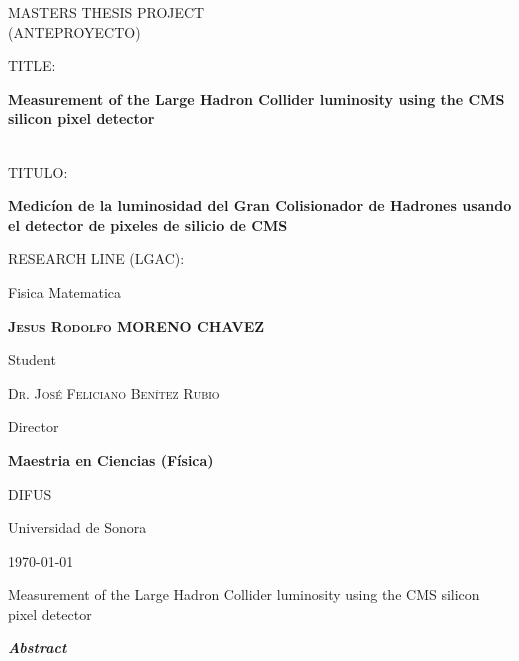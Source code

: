 \documentclass[final,12pt]{article}
\def\Student{Jesus Rodolfo MORENO CHAVEZ }
\def\Title{MASTERS THESIS PROJECT}
\def\TitleESP{(ANTEPROYECTO)}
\def\Prog{Maestria en Ciencias (F\'{i}sica) }
\def\Dept{DIFUS}
\def\Institution{Universidad de Sonora}
\def\Director{Dr. Jos\'{e} Feliciano Ben\'{i}tez Rubio}
\def\ProjectTitle{Measurement of the Large Hadron Collider luminosity using the CMS silicon pixel detector}
\def\ProjectTitleESP{Medic\'{i}on de la luminosidad del Gran Colisionador de Hadrones usando el detector de pixeles de silicio de CMS}
\def\ResearchLine{Fisica Matematica}
\begin{document}
\onehalfspacing

\begin{titlepage}
\centering
\hspace{0pt}
{\scshape\Large \Title \\ \TitleESP \par}
  
  \vspace{1cm}
  {
    TITLE:\par
    {\bf \large \ProjectTitle  \par}
    \\
    \vspace{0.4cm}
    TITULO:\par
    {\bf \large \ProjectTitleESP \par}
  }
       
  \vspace{1cm}
  {
    RESEARCH LINE (LGAC): \par
    \ResearchLine \par
  }
        
  \vspace{2cm}
  {\underline{\hspace{8cm}}\par}
  {\bf \scshape \Student \par}
  {Student\par}

  \vspace{1cm}
  {\underline{\hspace{8cm}}\par}
  {\scshape \Director \par}
  {Director\par}

  \vspace{1cm}
  {\bf \Prog \par}
  {\Dept \par}
  {\Institution \par}

  \vspace{2cm}
  {\today}

\hspace{0pt}
\vfill

\end{titlepage}


\shipout\null


\newpage
\hspace{2pt}
\vfill

  \begin{center}
    {\Large \ProjectTitle \par}
    \vspace{1cm}
    {\itshape\textbf{Abstract}\par}
  \end{center}
  
\end{document}
